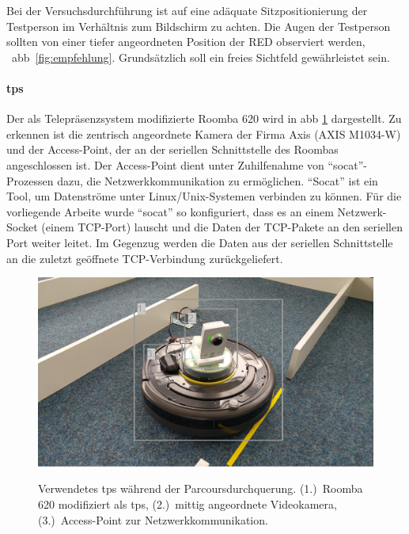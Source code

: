 Bei der Versuchsdurchführung ist auf eine adäquate Sitzpositionierung der Testperson im Verhältnis zum Bildschirm zu achten. Die Augen der Testperson sollten von einer tiefer angeordneten Position der RED observiert werden, \vgl~\acs{abb}~\ref{fig:empfehlung}. Grundsätzlich soll ein freies Sichtfeld gewährleistet sein.

\paragraph{\acf{tps}}
Der als Telepräsenzsystem modifizierte Roomba 620 wird in \acs{abb} \ref{fig:subroomba} dargestellt. Zu erkennen ist die zentrisch angeordnete Kamera der Firma Axis (AXIS M1034-W) und der Access-Point, der an der seriellen Schnittstelle des Roombas angeschlossen ist. Der Access-Point dient unter Zuhilfenahme von \enquote{socat}-Prozessen dazu, die Netzwerkkommunikation zu ermöglichen. \enquote{Socat} ist ein Tool, um Datenströme unter Linux/Unix-Systemen verbinden zu können. Für die vorliegende Arbeite wurde \enquote{socat} so konfiguriert, dass es an einem Netzwerk-Socket (einem TCP-Port) lauscht und die Daten der TCP-Pakete an den seriellen Port weiter leitet. Im Gegenzug werden die Daten aus der seriellen Schnittstelle an die zuletzt geöffnete TCP-Verbindung zurückgeliefert. %
 
\begin{figure}[ht]
\begin{minipage}[b]{\linewidth} 
      \centering 
  \includegraphics[width=0.7\linewidth]{bilder/evaluation/roomba.pdf}
  \label{fig:subroomba} 
   \end{minipage}%
\caption{Verwendetes \acl{tps} während der Parcoursdurchquerung. (1.)~Roomba 620 modifiziert als \acl{tps}, (2.)~mittig angeordnete Videokamera, (3.)~Access-Point zur Netzwerkkommunikation.}
\label{fig:subroomba}
\end{figure}


